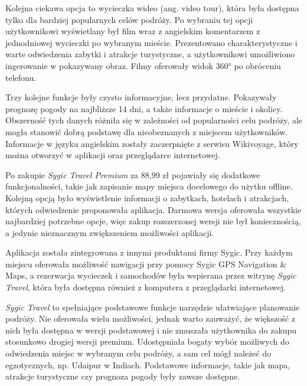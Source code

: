 \documentclass[10pt,twoside,a4paper]{report}
\begin{document}
\par Kolejna ciekawa opcja to wycieczka wideo (ang. video tour), która była dostępna tylko dla bardziej popularnych celów podróży. Po wybraniu tej opcji użytkownikowi wyświetlany był film wraz z angielskim komentarzem z jednodniowej wycieczki po wybranym mieście. Prezentowano charakterystyczne i warte odwiedzenia zabytki i atrakcje turystyczne, a użytkownikowi umożliwiono ingerowanie w pokazywany obraz. Filmy oferowały widok 360° po obróceniu telefonu.
\par Trzy kolejne funkcje były czysto informacyjne, lecz przydatne. Pokazywały prognozę pogody na najbliższe 14 dni, a także informacje o mieście i okolicy. Obszerność tych danych różniła się w zależności od popularności celu podróży, ale mogła stanowić dobrą podstawę dla nieobeznanych z miejscem użytkowników. Informacje w języku angielskim zostały zaczerpnięte z serwisu Wikivoyage, który można otworzyć w aplikacji oraz przeglądarce internetowej.
\par Po zakupie \textit{Sygic Travel Premium} za 88,99 zł pojawiały się dodatkowe funkcjonalności, takie jak zapisanie mapy miejsca docelowego do użytku offline. Kolejną opcją było wyświetlenie informacji o zabytkach, hotelach i atrakcjach, których odwiedzenie proponowała aplikacja. Darmowa wersja oferowała wszystkie najbardziej potrzebne opcje, więc zakup rozszerzonej wersji nie był koniecznością, a jedynie nieznacznym zwiększeniem możliwości aplikacji.
\par Aplikacja została zintegrowana z innymi produktami firmy Sygic. Przy każdym miejscu oferowała możliwość nawigacji przy pomocy Sygic GPS Navigation \& Maps, a rezerwacja wycieczek i samochodów była wspierana przez witrynę \textit{Sygic Travel}, która była dostępna również z komputera z przeglądarki internetowej.
\par \textit{Sygic Travel} to spełniające podstawowe funkcje narzędzie ułatwiające planowanie podróży. Nie oferowała wielu możliwości, jednak warto zauważyć, że większość z nich była dostępna w wersji podstawowej i nie zmuszała użytkownika do zakupu stosunkowo drogiej wersji premium. Udostępniała bogaty wybór możliwych do odwiedzenia miejsc w wybranym celu podróży, a sam cel mógł należeć do egzotycznych, np. Udaipur w Indiach. Podstawowe informacje, takie jak mapa, atrakcje turystyczne czy prognoza pogody były zawsze dostępne. 
\end{document}
